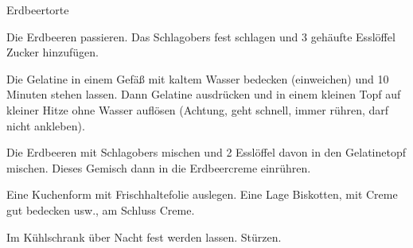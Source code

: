 \begin{recipe}{Erdbeertorte}

    \begin{ingredients}
    \end{ingredients}

    \begin{instructions}
        Die Erdbeeren passieren.
        Das Schlagobers fest schlagen und 3 gehäufte Esslöffel Zucker hinzufügen.

        Die Gelatine in einem Gefäß mit kaltem Wasser bedecken (einweichen) und 10 Minuten stehen lassen.
        Dann Gelatine ausdrücken und in einem kleinen Topf auf kleiner Hitze ohne Wasser auflösen (Achtung, geht schnell, immer rühren, darf nicht ankleben).

        Die Erdbeeren mit Schlagobers mischen und 2 Esslöffel davon in den Gelatinetopf mischen.
        Dieses Gemisch dann in die Erdbeercreme einrühren.

        Eine Kuchenform mit Frischhaltefolie auslegen.
        Eine Lage Biskotten, mit Creme gut bedecken usw., am Schluss Creme.

        Im Kühlschrank über Nacht fest werden lassen. Stürzen.
    \end{instructions}
\end{recipe}
